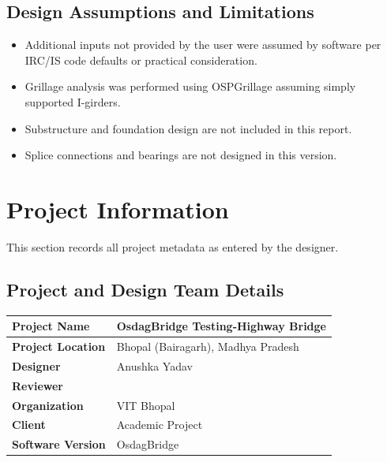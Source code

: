 \documentclass[12pt,a4paper]{report}
\numberwithin{table}{chapter}
\numberwithin{figure}{chapter}
\begin{document}
\section*{Design Assumptions and Limitations}
\label{sec:assumptions}

\begin{itemize}
\item Additional inputs not provided by the user were assumed by software per IRC/IS code defaults or practical consideration.
\item Grillage analysis was performed using OSPGrillage assuming simply supported I-girders.
\item Substructure and foundation design are not included in this report.
\item Splice connections and bearings are not designed in this version.
\end{itemize}

\titleformat{\chapter}[block]{\normalfont\Large\bfseries\centering}{\thechapter}{1em}{}
\titlespacing*{\chapter}{0pt}{-30pt}{10pt}


\chapter{Project Information}

This section records all project metadata as entered by the designer.

\section{Project and Design Team Details}
\label{sec:project-details}

\begin{tabular}{|L{5.5cm}|L{8.5cm}|}
\hline
\textbf{Project Name} & OsdagBridge Testing-Highway Bridge \\
\hline
\textbf{Project Location} & Bhopal (Bairagarh), Madhya Pradesh \\
\hline
\textbf{Designer} & Anushka Yadav \\
\hline
\textbf{Reviewer} &  \\
\hline
\textbf{Organization} & VIT Bhopal \\
\hline
\textbf{Client} & Academic Project \\
\hline
\textbf{Software Version} & OsdagBridge \\
\hline
\end{tabular}
\end{document}
